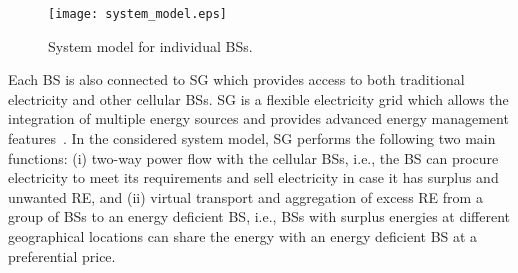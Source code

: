 \documentclass[10pt, letter,twocolumn]{IEEEtran}
\begin{document}
\begin{figure}
  \centering
  \texttt{[image: system\_model.eps]}\vspace{-0.0in}
  \caption{System model for individual BSs.}\label{sys_model} \vspace{-0.0in}
\end{figure}

Each BS is also connected to SG which provides access to both traditional electricity and other cellular BSs. SG is a flexible electricity grid which allows the integration of multiple energy sources and provides advanced energy management features~\cite{smart_grid}. In the considered system model, SG performs the following two main functions: (i) two-way power flow with the cellular BSs, i.e., the BS can procure electricity to meet its requirements and sell electricity in case it has surplus and unwanted RE, and (ii) virtual transport and aggregation of excess RE from a group of BSs to an energy deficient BS, i.e., BSs with surplus energies at different geographical locations can share the energy with an energy deficient BS at a preferential price.
\end{document}
